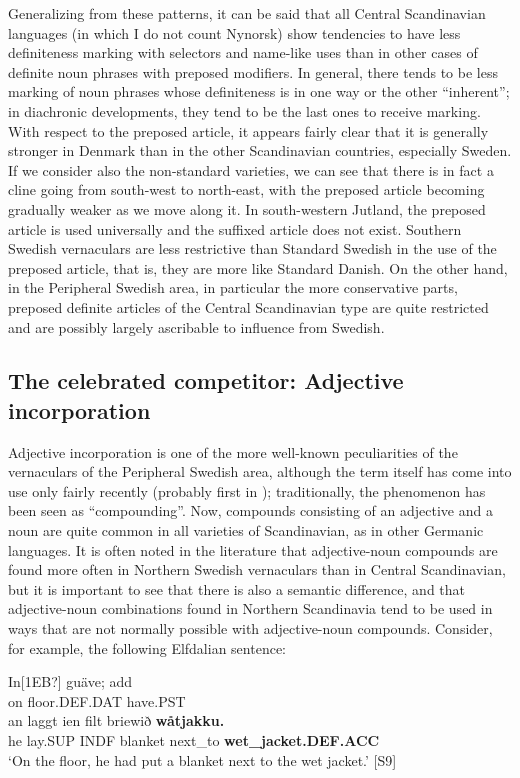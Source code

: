 Generalizing from these patterns, it can be said that all Central Scandinavian languages (in which I do not count Nynorsk) show tendencies to have less definiteness marking with selectors and name-like uses than in other cases of definite noun phrases with preposed modifiers. In general, there tends to be less marking of noun phrases whose definiteness is in one way or the other “inherent”; in diachronic developments, they tend to be the last ones to receive marking. With respect to the preposed article, it appears fairly clear that it is generally stronger in Denmark than in the other Scandinavian countries, especially Sweden. If we consider also the non-standard varieties, we can see that there is in fact a cline going from south-west to north-east, with the preposed article becoming gradually weaker as we move along it. In south-western Jutland, the preposed article is used universally and the suffixed article does not exist. Southern Swedish vernaculars are less restrictive than Standard Swedish in the use of the preposed article, that is, they are more like Standard Danish. On the other hand, in the Peripheral Swedish area, in particular the more conservative parts, preposed definite articles of the Central Scandinavian type are quite restricted and are possibly largely ascribable to influence from Swedish. 

\subsection{The celebrated competitor: Adjective incorporation}

Adjective incorporation is one of the more well-known peculiarities of the vernaculars of the Peripheral Swedish area, although the term itself has come into use only fairly recently (probably first in \citet{SandströmEtAl}); traditionally, the phenomenon has been seen as “compounding”. Now, compounds consisting of an adjective and a noun are quite common in all varieties of Scandinavian, as in other Germanic languages. It is often noted in the literature that adjective-noun compounds are found more often in Northern Swedish vernaculars than in Central Scandinavian, but it is important to see that there is also a semantic difference, and that adjective-noun combinations found in Northern Scandinavia tend to be used in ways that are not normally possible with adjective-noun compounds. Consider, for example, the following Elfdalian sentence:

\ea\label{}
\gll In[1EB?]  guäve;  add\\
on  floor.DEF.DAT  have.PST\\
\gll an  laggt  ien  filt  briewið  \textbf{wåtjakku.}\\
he  lay.SUP  INDF  blanket  next\_to  \textbf{wet\_jacket.DEF.ACC}\\
\glt  ‘On the floor, he had put a blanket next to the wet jacket.’ [S9]
\z

